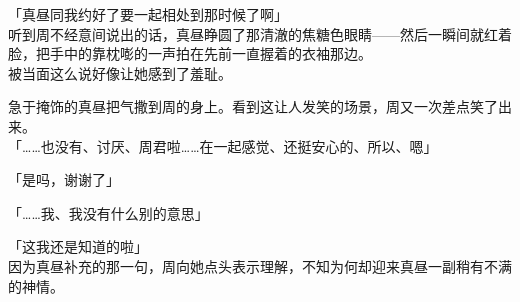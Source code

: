 「真昼同我约好了要一起相处到那时候了啊」\\

听到周不经意间说出的话，真昼睁圆了那清澈的焦糖色眼睛——然后一瞬间就红着脸，把手中的靠枕嘭的一声拍在先前一直握着的衣袖那边。\\

被当面这么说好像让她感到了羞耻。

急于掩饰的真昼把气撒到周的身上。看到这让人发笑的场景，周又一次差点笑了出来。\\

「……也没有、讨厌、周君啦……在一起感觉、还挺安心的、所以、嗯」

「是吗，谢谢了」

「……我、我没有什么别的意思」

「这我还是知道的啦」\\

因为真昼补充的那一句，周向她点头表示理解，不知为何却迎来真昼一副稍有不满的神情。
